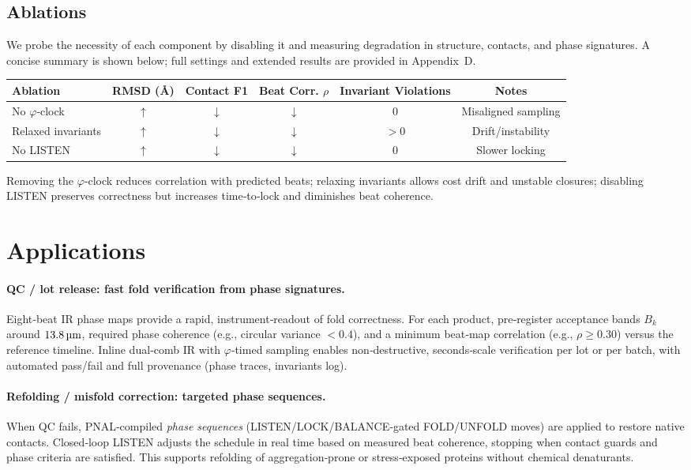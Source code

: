 \documentclass[12pt,a4paper]{article}
\begin{document}
\subsection{Ablations}
We probe the necessity of each component by disabling it and measuring degradation in structure, contacts, and phase signatures. A concise summary is shown below; full settings and extended results are provided in Appendix~D.
\begin{center}
\renewcommand{\arraystretch}{1.15}
\begin{tabular}{@{}lccccc@{}}
\toprule
Ablation & RMSD (Å) & Contact F1 & Beat Corr. $\rho$ & Invariant Violations & Notes \\
\midrule
No $\varphi$‑clock & $\uparrow$ & $\downarrow$ & $\downarrow$ & 0 & Misaligned sampling \\
Relaxed invariants & $\uparrow$ & $\downarrow$ & $\downarrow$ & $>0$ & Drift/instability \\
No LISTEN & $\uparrow$ & $\downarrow$ & $\downarrow$ & 0 & Slower locking \\
\bottomrule
\end{tabular}
\end{center}
Removing the $\varphi$‑clock reduces correlation with predicted beats; relaxing invariants allows cost drift and unstable closures; disabling LISTEN preserves correctness but increases time‑to‑lock and diminishes beat coherence.

\section{Applications}

\paragraph{QC / lot release: fast fold verification from phase signatures.}
Eight‑beat IR phase maps provide a rapid, instrument‑readout of fold correctness. For each product, pre‑register acceptance bands $B_k$ around $13.8\,\text{\textmu m}$, required phase coherence (e.g., circular variance $<0.4$), and a minimum beat‑map correlation (e.g., $\rho \ge 0.30$) versus the reference timeline. Inline dual‑comb IR with $\varphi$‑timed sampling enables non‑destructive, seconds‑scale verification per lot or per batch, with automated pass/fail and full provenance (phase traces, invariants log).

\paragraph{Refolding / misfold correction: targeted phase sequences.}
When QC fails, PNAL‑compiled \emph{phase sequences} (LISTEN/LOCK/BALANCE‑gated FOLD/UNFOLD moves) are applied to restore native contacts. Closed‑loop LISTEN adjusts the schedule in real time based on measured beat coherence, stopping when contact guards and phase criteria are satisfied. This supports refolding of aggregation‑prone or stress‑exposed proteins without chemical denaturants.
\end{document}
